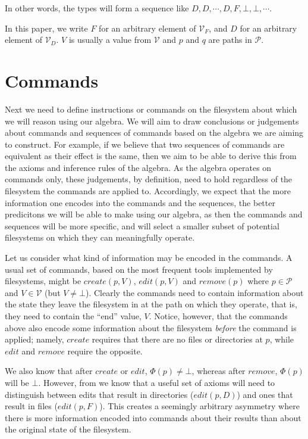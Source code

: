 \documentclass[12pt]{article}
\newcommand{\setv}{\mathcal{V}}
\newcommand{\setvx}[1]{\mathcal{V}_{#1}}
\newcommand{\setf}{\setvx{F}}
\newcommand{\setd}{\setvx{D}}
\newcommand{\setp}{\mathcal{P}}
\newcommand{\empt}{\bot}
\newcommand{\FS}{\Phi} %
\begin{document}


In other words, the types will form a sequence like $D,D,\cdots,D,F,\empt,\empt,\cdots$.

In this paper, we write $F$ for an arbitrary element of $\setf$, and $D$ for an arbitrary element
of $\setd$. $V$ is usually a value from $\setv$ and $p$ and $q$ are paths in $\setp$.

\section{Commands}

Next we need to define instructions or commands on the filesystem about which we will reason
using our algebra.
We will aim to draw conclusions or judgements about commands and sequences of commands
based on the algebra we are aiming to construct.
For example, if we believe that two sequences of commands are equivalent as their effect
is the same, then we aim to be able to derive this from the axioms and inference rules of the
algebra.
As the algebra operates on commands only,
these judgements, by definition, need to hold regardless of the filesystem the commands are applied to.
Accordingly, we expect that the more information one encodes into the commands and the sequences,
the better predicitons we will be able to make using our algebra,
as then the commands and sequences will be more specific, and will select a smaller subset
of potential filesystems on which they can meaningfully operate.

Let us consider what kind of information may be encoded in the commands.
A usual set of commands, based on the most frequent tools implemented by filesystems,
might be $create(p,V)$, $edit(p,V)$ and $remove(p)$ where $p\in\setp$ and $V\in\setv$ (but $V\neq\empt$).
Clearly the commands need to contain information about the state they leave the filesystem
in at the path on which they operate, that is, they need to contain the ``end'' value, $V$.
Notice, however, that the commands above also encode some information about the filesystem
{\it before} the command is applied; namely, $create$ requires that there are no files
or directories at $p$, while $edit$ and $remove$ require the opposite.

We also know that after $create$ or $edit$, $\FS(p)\neq\empt$, whereas after $remove$,
$\FS(p)$ will be $\empt$. However, from \cite{NREC:alg} we know that a useful set of axioms
will need to distinguish between edits that result in directories ($edit(p,D)$) and
ones that result in files ($edit(p,F)$). This creates a seemingly arbitrary asymmetry where
there is more information encoded into commands about their results than about the
original state of the filesystem.
\end{document}
